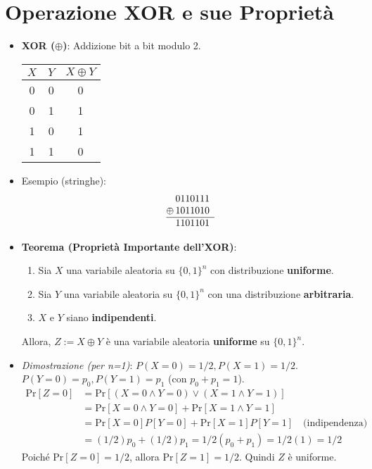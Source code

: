 \documentclass{article}
\begin{document}
\section{Operazione XOR e sue Proprietà}
\begin{itemize}
    \item \textbf{XOR ($\oplus$)}: Addizione bit a bit modulo 2.
    \begin{center}
    \begin{tabular}{cc|c}
        $X$ & $Y$ & $X \oplus Y$ \\ \hline
        0 & 0 & 0 \\
        0 & 1 & 1 \\
        1 & 0 & 1 \\
        1 & 1 & 0
    \end{tabular}
    \end{center}
    \item Esempio (stringhe):
    \[
    \begin{array}{@{}c@{\,}c@{}c@{}c@{}c@{}c@{}c@{}c}
      & 0 & 1 & 1 & 0 & 1 & 1 & 1 \\
    \oplus & 1 & 0 & 1 & 1 & 0 & 1 & 0 \\ \hline
      & 1 & 1 & 0 & 1 & 1 & 0 & 1
    \end{array}
    \]
    \item \textbf{Teorema (Proprietà Importante dell'XOR)}:
    \begin{enumerate}
        \item Sia $X$ una variabile aleatoria su $\{0,1\}^n$ con distribuzione \textbf{uniforme}.
        \item Sia $Y$ una variabile aleatoria su $\{0,1\}^n$ con una distribuzione \textbf{arbitraria}.
        \item $X$ e $Y$ siano \textbf{indipendenti}.
    \end{enumerate}
    Allora, $Z := X \oplus Y$ è una variabile aleatoria \textbf{uniforme} su $\{0,1\}^n$.
    \item \textit{Dimostrazione (per n=1)}:
        $P(X=0)=1/2, P(X=1)=1/2$. $P(Y=0)=p_0, P(Y=1)=p_1$ (con $p_0+p_1=1$).
        \begin{align*} \text{Pr}[Z=0] &= \text{Pr}[(X=0 \land Y=0) \lor (X=1 \land Y=1)] \\ &= \text{Pr}[X=0 \land Y=0] + \text{Pr}[X=1 \land Y=1] \\ &= \text{Pr}[X=0]P[Y=0] + \text{Pr}[X=1]P[Y=1] \quad \text{(indipendenza)} \\ &= (1/2)p_0 + (1/2)p_1 = 1/2(p_0+p_1) = 1/2(1) = 1/2 \end{align*}
        Poiché $\text{Pr}[Z=0]=1/2$, allora $\text{Pr}[Z=1]=1/2$. Quindi $Z$ è uniforme.
\end{itemize}
\end{document}
